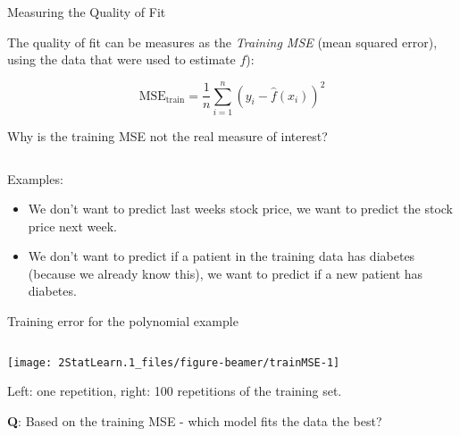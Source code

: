 \documentclass[ignorenonframetext,]{beamer}
\begin{document}
\begin{frame}

\begin{block}{Measuring the Quality of Fit}

\vspace{2mm}

The quality of fit can be measures as the \emph{Training MSE} (mean
squared error), using the data that were used to estimate \(f\)):

\[ \text{MSE}_{\text{train}}=\frac{1}{n}\sum_{i=1}^n (y_i-\hat{f}(x_i))^2\]
\(~\)

\end{block}

\end{frame}

\begin{frame}

Why is the training MSE not the real measure of interest?

\(~\)

Examples:

\begin{itemize}
\item
  We don't want to predict last weeks stock price, we want to predict
  the stock price next week.
\item
  We don't want to predict if a patient in the training data has
  diabetes (because we already know this), we want to predict if a new
  patient has diabetes.
\end{itemize}

\end{frame}

\begin{frame}

\begin{block}{Training error for the polynomial example}

\(~\)

\begin{center}\texttt{[image: 2StatLearn.1\_files/figure-beamer/trainMSE-1]} \end{center}

\vspace{2mm}

Left: one repetition, right: 100 repetitions of the training set.

\vspace{2mm}

\textbf{Q}: Based on the training MSE - which model fits the data the
best?

\end{block}

\end{frame}
\end{document}
